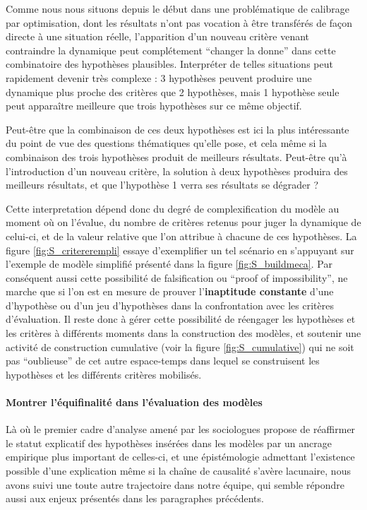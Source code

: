 Comme nous nous situons depuis le début dans une problématique de calibrage par optimisation, dont les résultats n'ont pas vocation à être transférés de façon directe à une situation réelle, l'apparition d'un nouveau critère venant contraindre la dynamique peut complétement \enquote{changer la donne} dans cette combinatoire des hypothèses plausibles. Interpréter de telles situations peut rapidement devenir très complexe : 3 hypothèses peuvent produire une dynamique plus proche des critères que 2 hypothèses, mais 1 hypothèse seule peut apparaître meilleure que trois hypothèses sur ce même objectif.

Peut-être que la combinaison de ces deux hypothèses est ici la plus intéressante du point de vue des questions thématiques qu'elle pose, et cela même si la combinaison des trois hypothèses produit de meilleurs résultats. Peut-être qu'à l'introduction d'un nouveau critère, la solution à deux hypothèses produira des meilleurs résultats, et que l'hypothèse 1 verra ses résultats se dégrader ?

Cette interpretation dépend donc du degré de complexification du modèle au moment où on l'évalue, du nombre de critères retenus pour juger la dynamique de celui-ci, et de la valeur relative que l'on attribue à chacune de ces hypothèses. La figure \ref{fig:S_critererempli} essaye d'exemplifier un tel scénario en s'appuyant sur l'exemple de modèle simplifié présenté dans la figure \ref{fig:S_buildmeca}. Par conséquent aussi cette possibilité de falsification ou \foreignquote{english}{proof of impossibility}, ne marche que si l'on est en mesure de prouver l'\textbf{inaptitude constante} d'une d'hypothèse ou d'un jeu d'hypothèses dans la confrontation avec les critères d’évaluation. Il reste donc à gérer cette possibilité de réengager les hypothèses et les critères à différents moments dans la construction des modèles, et soutenir une activité de construction cumulative (voir la figure \ref{fig:S_cumulative}) qui ne soit pas \enquote{oublieuse} de cet autre espace-temps dans lequel se construisent les hypothèses et les différents critères mobilisés.


\paragraph{Montrer l'équifinalité dans l'évaluation des modèles}
\label{p:nvlle_equifinalite}

Là où le premier cadre d'analyse amené par les sociologues propose de réaffirmer le statut explicatif des hypothèses insérées dans les modèles par un ancrage empirique plus important de celles-ci, et une épistémologie admettant l'existence possible d'une explication même si la chaîne de causalité s'avère lacunaire, nous avons suivi une toute autre trajectoire dans notre équipe, qui semble répondre aussi aux enjeux présentés dans les paragraphes précédents.

